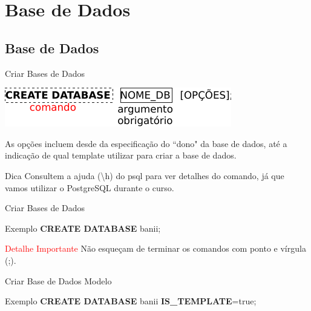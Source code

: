 \documentclass[xcolor=x11names,compress]{beamer}
\begin{document}
\section{Base de Dados}
\subsection{Base de Dados}

\begin{frame}{Criar Bases de Dados}

\centering \includegraphics[keepaspectratio,width=\textwidth]{create_database}

\begin{block}{}
As opções incluem desde da especificação do ``dono" da base de dados, até a indicação de qual template utilizar para criar a base de dados.
\end{block}

\pause 

\begin{alertblock}{\centering Dica}
Consultem a ajuda ({\textbackslash}h) do psql para ver detalhes do comando, já que vamos utilizar o PostgreSQL durante o curso.
\end{alertblock}


\end{frame}

\begin{frame}{Criar Bases de Dados}

\begin{alertblock}{Exemplo}
\centering \textbf{CREATE DATABASE} banii;
\end{alertblock}

\pause

\begin{alertblock}{\centering \textcolor{red}{Detalhe Importante}}
Não esqueçam de terminar os comandos com ponto e vírgula (;).
\end{alertblock}

\end{frame}

\begin{frame}{Criar Base de Dados Modelo}

\begin{alertblock}{Exemplo}
\centering \textbf{CREATE DATABASE} banii \textbf{IS\_TEMPLATE}=true;
\end{alertblock}

\end{frame}
\end{document}
